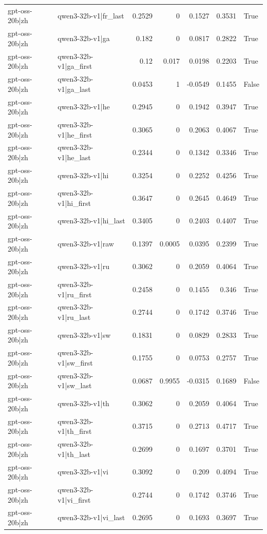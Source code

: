 \begin{table}
\begin{tabular}{l l r r r r l}
gpt-oss-20b|zh & qwen3-32b-v1|fr_last & 0.2529 & 0 & 0.1527 & 0.3531 & True \\
gpt-oss-20b|zh & qwen3-32b-v1|ga & 0.182 & 0 & 0.0817 & 0.2822 & True \\
gpt-oss-20b|zh & qwen3-32b-v1|ga_first & 0.12 & 0.017 & 0.0198 & 0.2203 & True \\
gpt-oss-20b|zh & qwen3-32b-v1|ga_last & 0.0453 & 1 & -0.0549 & 0.1455 & False \\
gpt-oss-20b|zh & qwen3-32b-v1|he & 0.2945 & 0 & 0.1942 & 0.3947 & True \\
gpt-oss-20b|zh & qwen3-32b-v1|he_first & 0.3065 & 0 & 0.2063 & 0.4067 & True \\
gpt-oss-20b|zh & qwen3-32b-v1|he_last & 0.2344 & 0 & 0.1342 & 0.3346 & True \\
gpt-oss-20b|zh & qwen3-32b-v1|hi & 0.3254 & 0 & 0.2252 & 0.4256 & True \\
gpt-oss-20b|zh & qwen3-32b-v1|hi_first & 0.3647 & 0 & 0.2645 & 0.4649 & True \\
gpt-oss-20b|zh & qwen3-32b-v1|hi_last & 0.3405 & 0 & 0.2403 & 0.4407 & True \\
gpt-oss-20b|zh & qwen3-32b-v1|raw & 0.1397 & 0.0005 & 0.0395 & 0.2399 & True \\
gpt-oss-20b|zh & qwen3-32b-v1|ru & 0.3062 & 0 & 0.2059 & 0.4064 & True \\
gpt-oss-20b|zh & qwen3-32b-v1|ru_first & 0.2458 & 0 & 0.1455 & 0.346 & True \\
gpt-oss-20b|zh & qwen3-32b-v1|ru_last & 0.2744 & 0 & 0.1742 & 0.3746 & True \\
gpt-oss-20b|zh & qwen3-32b-v1|sw & 0.1831 & 0 & 0.0829 & 0.2833 & True \\
gpt-oss-20b|zh & qwen3-32b-v1|sw_first & 0.1755 & 0 & 0.0753 & 0.2757 & True \\
gpt-oss-20b|zh & qwen3-32b-v1|sw_last & 0.0687 & 0.9955 & -0.0315 & 0.1689 & False \\
gpt-oss-20b|zh & qwen3-32b-v1|th & 0.3062 & 0 & 0.2059 & 0.4064 & True \\
gpt-oss-20b|zh & qwen3-32b-v1|th_first & 0.3715 & 0 & 0.2713 & 0.4717 & True \\
gpt-oss-20b|zh & qwen3-32b-v1|th_last & 0.2699 & 0 & 0.1697 & 0.3701 & True \\
gpt-oss-20b|zh & qwen3-32b-v1|vi & 0.3092 & 0 & 0.209 & 0.4094 & True \\
gpt-oss-20b|zh & qwen3-32b-v1|vi_first & 0.2744 & 0 & 0.1742 & 0.3746 & True \\
gpt-oss-20b|zh & qwen3-32b-v1|vi_last & 0.2695 & 0 & 0.1693 & 0.3697 & True \\

\end{tabular}
\end{table}
